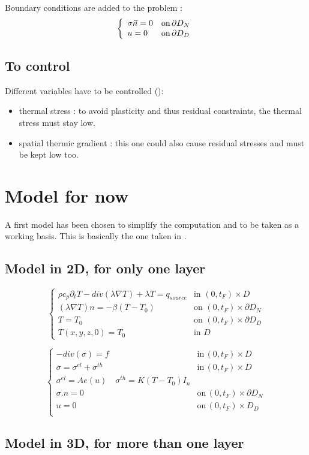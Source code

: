 \documentclass[11pt,a4paper]{article}
\begin{document}
Boundary conditions are added to the problem :
\begin{equation}
\left\{
\begin{array}{ll}
\sigma\vec{n}=0 & \textrm{on\,}\partial D_N \\
u=0 & \textrm{on\,}\partial D_D
\end{array}
\right.
\end{equation}

\subsection{To control}
Different variables have to be controlled (\cite{DebRoyAdditivemanufacturingmetallic2018}):

\begin{itemize} 
	\item thermal stress : to avoid plasticity and thus residual constraints, the thermal stress must stay low.
	\item spatial thermic gradient : this one could also cause residual stresses and must be kept low too.
\end{itemize}



\section{Model for now}
A first model has been chosen to simplify the computation and to be taken as a working basis. This is basically the one taken in \cite{AllaireTakingaccountthermal2017}.

\subsection{Model in 2D, for only one layer}

\begin{equation}
\left\{
\begin{array}{ll}
\rho c_p\partial_tT-div(\lambda\nabla T)+\lambda T=q_{source}  & \textrm{in}\,\,(0,t_F)\times D \\
(\lambda \nabla T)n=-\beta (T-T_0) & \textrm{on}\,\,(0,t_F)\times \partial D_N \\
T=T_0 &\textrm{on}\,\,(0,t_F)\times \partial D_D \\
T(x,y,z,0)=T_0 & \textrm{in}\,\,D
\end{array}
\right.
\end{equation}

\begin{equation}
\label{eq:elastoplasticSystem}
\left\{
\begin{array}{ll}
-div(\sigma)=f & \textrm{in}\,(0,t_F)\times D \\
\sigma=\sigma^{el}+\sigma^{th} & \textrm{in}\,(0,t_F)\times D \\
\sigma^{el}=Ae(u)\quad \sigma^{th}=K(T-T_0)I_n \\
\sigma.n=0 & \textrm{on}\,(0,t_F)\times \partial D_N \\
u=0 & \textrm{on}\,(0,t_F)\times D_D \\
\end{array}
\right.
\end{equation}

\subsection{Model in 3D, for more than one layer}



\end{document}
